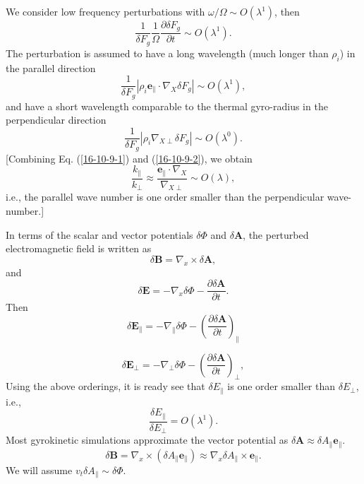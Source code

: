 \documentclass{llncs}
\begin{document}
We consider low frequency perturbations with $\omega / \Omega \sim O
(\lambda^1)$, then
\begin{equation}
  \frac{1}{\delta F_g} \frac{1}{\Omega} \frac{\partial \delta F_g}{\partial t}
  \sim O (\lambda^1) .
\end{equation}
The perturbation is assumed to have a long wavelength (much longer than
$\rho_i$) in the parallel direction
\begin{equation}
  \label{16-10-9-1} \frac{1}{\delta F_g} | \rho_i \mathbf{e}_{\parallel} \cdot
  \nabla_X \delta F_g | \sim O (\lambda^1),
\end{equation}
and have a short wavelength comparable to the thermal gyro-radius in the
perpendicular direction
\begin{equation}
  \label{16-10-9-2} \frac{1}{\delta F_g} | \rho_i \nabla_{X \perp} \delta F_g
  | \sim O (\lambda^0) .
\end{equation}
[Combining Eq. (\ref{16-10-9-1}) and (\ref{16-10-9-2}), we obtain
\begin{equation}
  \frac{k_{\parallel}}{k_{\perp}} \approx \frac{\mathbf{e}_{\parallel} \cdot
  \nabla_X}{\nabla_{X \perp}} \sim O (\lambda),
\end{equation}
i.e., the parallel wave number is one order smaller than the perpendicular
wave-number.]

In terms of the scalar and vector potentials $\delta \Phi$ and $\delta
\mathbf{A}$, the perturbed electromagnetic field is written as
\begin{equation}
  \delta \mathbf{B}= \nabla_x \times \delta \mathbf{A},
\end{equation}
and
\begin{equation}
  \label{18-3-6-a7} \delta \mathbf{E}= - \nabla_x \delta \Phi - \frac{\partial
  \delta \mathbf{A}}{\partial t} .
\end{equation}
Then
\begin{equation}
  \delta \mathbf{E}_{\parallel} = - \nabla_{\parallel} \delta \Phi - \left(
  \frac{\partial \delta \mathbf{A}}{\partial t} \right)_{\parallel}
\end{equation}

\begin{equation}
  \delta \mathbf{E}_{\perp} = - \nabla_{\perp} \delta \Phi - \left(
  \frac{\partial \delta \mathbf{A}}{\partial t} \right)_{\perp},
\end{equation}
Using the above orderings, it is ready see that $\delta E_{\parallel}$ is one
order smaller than $\delta E_{\perp}$, i.e.,
\begin{equation}
  \frac{\delta E_{\parallel}}{\delta E_{\perp}} = O (\lambda^1) .
\end{equation}
Most gyrokinetic simulations approximate the vector potential as $\delta
\mathbf{A} \approx \delta A_{\parallel} \mathbf{e}_{\parallel}$.
\begin{equation}
  \delta \mathbf{B}= \nabla_x \times (\delta A_{\parallel}
  \mathbf{e}_{\parallel}) \approx \nabla_x \delta A_{\parallel} \times
  \mathbf{e}_{\parallel} .
\end{equation}
We will assume $v_t \delta A_{\parallel} \sim \delta \Phi$.
\end{document}
